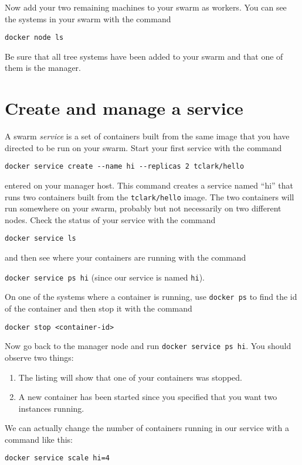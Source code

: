 \documentclass{article}
\begin{document}
Now add your two remaining machines to your swarm as workers. You can see the systems in your swarm with the command

\texttt{docker node ls}

Be sure that all tree systems have been added to your swarm and that one of them is the manager.

\section{Create and manage a service}
A swarm \emph{service} is a set of containers built from the same image that you have directed to be run on your swarm. Start your first service with the command 

\begin{verbatim}
docker service create --name hi --replicas 2 tclark/hello
\end{verbatim}

entered on your manager host. This command creates a service named ``hi'' that runs two containers built from the \texttt{tclark/hello} image. The two containers will run somewhere on your swarm, probably but not necessarily on two different nodes. Check the status of your service with the command

\texttt{docker service ls}

and then see where your containers are running with the command

\texttt{docker service ps hi} (since our service is named \texttt{hi}).

On one of the systems where a container is running, use \texttt{docker ps} to find the id of the container and then stop it with the command

\texttt{docker stop <container-id>}

Now go back to the manager node and run \texttt{docker service ps hi}. You should observe two things:

\begin{enumerate}
  \item The listing will show that one of your containers was stopped.
  \item A new container has been started since you specified that you want two instances running.
\end{enumerate}

We can actually change the number of containers running in our service with a command like this:

\texttt{docker service scale hi=4}
\end{document}
